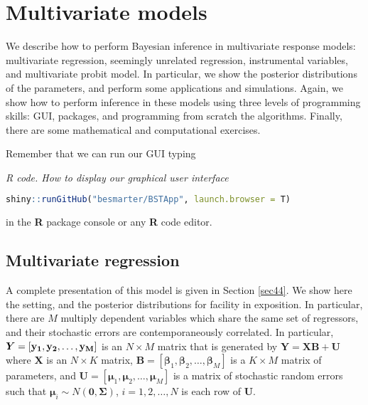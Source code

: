 \chapter{Multivariate models}\label{chap7}

We describe how to perform Bayesian inference in multivariate response models: multivariate regression, seemingly unrelated regression, instrumental variables, and multivariate probit model. In particular, we show the posterior distributions of the parameters, and perform some applications and simulations. Again, we show how to perform inference in these models using three levels of programming skills: GUI, packages, and programming from scratch the algorithms. Finally, there are some mathematical and computational exercises.

Remember that we can run our GUI typing

\begin{tcolorbox}[enhanced,width=4.67in,center upper,
	fontupper=\large\bfseries,drop shadow southwest,sharp corners]
	\textit{R code. How to display our graphical user interface}
	\begin{VF}
		\begin{lstlisting}[language=R]
	shiny::runGitHub("besmarter/BSTApp", launch.browser = T)
\end{lstlisting}
	\end{VF}
\end{tcolorbox} 

in the \textbf{R} package console or any \textbf{R} code editor.

\section{Multivariate regression}\label{sec71}

A complete presentation of this model is given in Section \ref{sec44}. We show here the setting, and the posterior distributions for facility in exposition. In particular, there are $M$ multiply dependent variables which share the same set of regressors, and their stochastic errors are contemporaneously correlated. In particular, $\bm{Y}=\left[{\bf{y_{1}}},{\bf{y_{2}}},\ldots,{\bf{y_{M}}}\right]$ is an $ N\times M$ matrix that is generated by $\bm{Y}=\bm{X}\bm{B}+\bm{U}$ where $\bm{X}$ is an $ N\times K$ matrix, $\bm{B}=\left[\bm{\beta}_{1},\bm{\beta}_{2},\ldots,\bm{\beta}_{M}\right]$ is a $ K\times M$ matrix of parameters, and $\bm{U}=\left[\bm{\mu}_{1},\bm{\mu}_{2},\ldots,\bm{\mu}_{M}\right]$ is a matrix of stochastic random errors such that $\bm{\mu}_i\sim{N}(\bm{0},\bm{\Sigma})$, $i=1,2,\dots,N$ is each row of $\bm{U}$.

